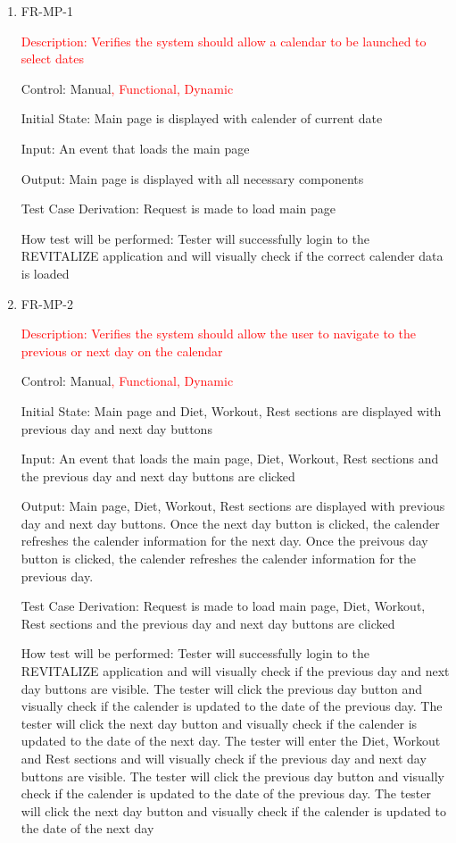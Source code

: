 \documentclass[12pt, titlepage]{article}
\begin{document}
\begin{enumerate}
	
	\item{FR-MP-1\\}

        \textcolor{red}{Description: Verifies the system should allow a calendar to be launched to select dates}
	
	Control: Manual\textcolor{red}{, Functional, Dynamic}
	
	Initial State: Main page is displayed with calender of current date
	
	Input: An event that loads the main page
	
	Output: Main page is displayed with all necessary components
	
	Test Case Derivation: Request is made to load main page
	
	How test will be performed: Tester will successfully login to the REVITALIZE application and will visually check if the correct calender data is loaded
	
	\item{FR-MP-2\\}
 
        \textcolor{red}{Description: Verifies the system should allow the user to navigate to the previous or next day on the calendar}
	
	Control: Manual\textcolor{red}{, Functional, Dynamic}
	
	Initial State: Main page and Diet, Workout, Rest sections are displayed with previous day and next day buttons
	
	Input: An event that loads the main page, Diet, Workout, Rest sections and the previous day and next day  buttons are clicked
	
	Output: Main page, Diet, Workout, Rest sections are displayed with previous day and next day buttons. Once the next day button is clicked, the calender refreshes  the calender information for the next day. Once the preivous day button is clicked, the calender refreshes the calender information for the previous day.
	
	Test Case Derivation: Request is made to load main page, Diet, Workout, Rest sections and the previous day and next day buttons are clicked
	
	How test will be performed: Tester will successfully login to the REVITALIZE application and will visually check if the previous day and next day buttons are visible. The tester will click the previous day button and visually check if the calender is updated to the date of the previous day. The tester will click the next day button and visually check if the calender is updated to the date of the next day. The tester will enter the Diet, Workout and Rest sections and will visually check if the previous day and next day buttons are visible. The tester will click the previous day button and visually check if the calender is updated to the date of the previous day. The tester will click the next day button and visually check if the calender is updated to the date of the next day
	

\end{enumerate}
\end{document}
